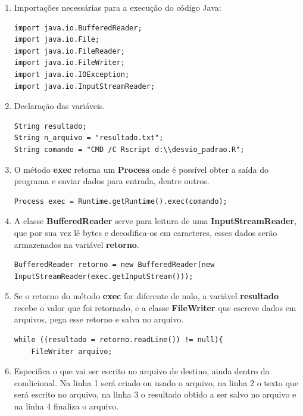 \documentclass[14pt, a4paper]{article}
\begin{document}
\begin{enumerate}
\item Importações necessárias para a execução do código Java:

\begin{lstlisting}
import java.io.BufferedReader;
import java.io.File;
import java.io.FileReader;
import java.io.FileWriter;
import java.io.IOException;
import java.io.InputStreamReader;
\end{lstlisting}

\item Declaração das variáveis.

\begin{lstlisting}
String resultado; 
String n_arquivo = "resultado.txt";
String comando = "CMD /C Rscript d:\\desvio_padrao.R";
\end{lstlisting}

\item O método \textbf{exec} retorna um \textbf{Process} onde é possível obter a saída do programa e enviar dados para entrada, dentre outros.

\begin{lstlisting}
Process exec = Runtime.getRuntime().exec(comando);
\end{lstlisting}

\item A classe \textbf{BufferedReader} serve para leitura de uma \textbf{InputStreamReader}, que por sua vez lê bytes e decodifica-os em caracteres, esses dados serão armazenados na variável \textbf{retorno}.
        
\begin{lstlisting}
BufferedReader retorno = new BufferedReader(new InputStreamReader(exec.getInputStream()));
\end{lstlisting}

\item Se o retorno do método \textbf{exec} for diferente de nulo, a variável \textbf{resultado} recebe o valor que foi retornado, e a classe \textbf{FileWriter} que escreve dados em arquivos, pega esse retorno e salva no arquivo.

\begin{lstlisting}          
while ((resultado = retorno.readLine()) != null){
	FileWriter arquivo;
\end{lstlisting}                

\item Especifica o que vai ser escrito no arquivo de destino, ainda dentro da condicional. Na linha 1 será criado ou usado o arquivo, na linha 2 o texto que será escrito no arquivo, na linha 3 o resultado obtido a ser salvo no arquivo e na linha 4 finaliza o arquivo.


\end{enumerate}
\end{document}
